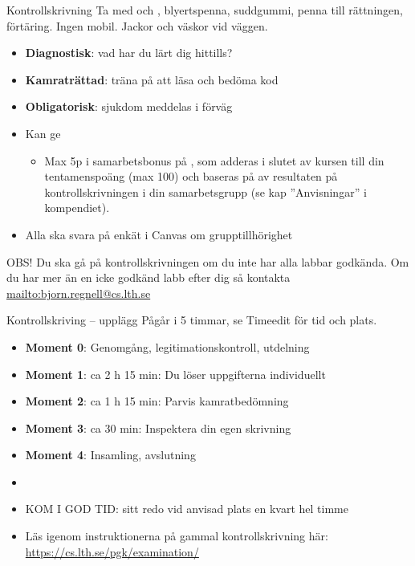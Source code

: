 


\begin{Slide}{Kontrollskrivning}\SlideFontSmall
Ta med  och , blyertspenna, suddgummi,  penna till rättningen, förtäring. Ingen mobil. Jackor och väskor vid väggen.
\begin{itemize}
  \item \textbf{Diagnostisk}: vad har du lärt dig hittills?
  \item \textbf{Kamraträttad}: träna på att läsa och bedöma kod
  \item \textbf{Obligatorisk}: sjukdom  meddelas i förväg
  \item Kan ge  
  \begin{itemize}\SlideFontTiny
    \item[] Max 5p i samarbetsbonus på , som adderas i slutet av kursen till din tentamenspoäng (max 100) och baseras på  av resultaten på kontrollskrivningen i din samarbetsgrupp (se kap ''Anvisningar'' i kompendiet).
  \end{itemize}
  \ifkompendium\else
  \item Alla ska svara på enkät i Canvas om grupptillhörighet
  \fi
\end{itemize}
OBS! Du ska gå på kontrollskrivningen  om du inte har alla labbar godkända. Om du har mer än en icke godkänd labb efter dig så kontakta \url{mailto:bjorn.regnell@cs.lth.se}
\end{Slide}

\begin{Slide}{Kontrollskriving -- upplägg}\SlideFontSmall
Pågår i 5 timmar, se Timeedit för tid och plats.
\begin{itemize}
\item \textbf{Moment 0}: Genomgång, legitimationskontroll, utdelning
\item \textbf{Moment 1}: ca 2 h 15 min: Du löser uppgifterna individuellt
\item \textbf{Moment 2}: ca 1 h 15 min: Parvis kamratbedömning
\item \textbf{Moment 3}: ca 30 min: Inspektera din egen skrivning
\item \textbf{Moment 4}: Insamling, avslutning
\item[]
\item KOM I GOD TID: sitt redo vid anvisad plats en kvart  hel timme
\item Läs  igenom instruktionerna på gammal kontrollskrivning här: 
\url{https://cs.lth.se/pgk/examination/}

\end{itemize}


\end{Slide}

